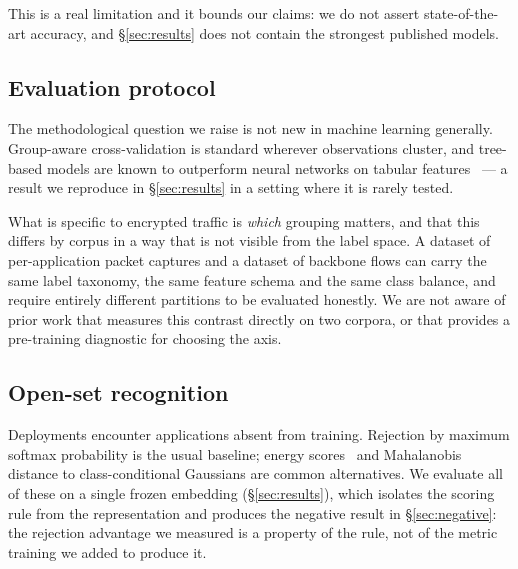 This is a real limitation and it bounds our claims: we do not assert
state-of-the-art accuracy, and \S\ref{sec:results} does not contain the
strongest published models.

\subsection{Evaluation protocol}

The methodological question we raise is not new in machine learning generally.
Group-aware cross-validation is standard wherever observations cluster, and
tree-based models are known to outperform neural networks on tabular
features~\cite{grinsztajn2022trees} --- a result we reproduce in
\S\ref{sec:results} in a setting where it is rarely tested.

What is specific to encrypted traffic is \emph{which} grouping matters, and
that this differs by corpus in a way that is not visible from the label space.
A dataset of per-application packet captures and a dataset of backbone flows
can carry the same label taxonomy, the same feature schema and the same class
balance, and require entirely different partitions to be evaluated honestly.
We are not aware of prior work that measures this contrast directly on two
corpora, or that provides a pre-training diagnostic for choosing the axis.

\subsection{Open-set recognition}

Deployments encounter applications absent from training. Rejection by maximum
softmax probability is the usual baseline; energy scores~\cite{liu2020energy}
and Mahalanobis distance to class-conditional Gaussians are common
alternatives. We evaluate all of these on a single frozen embedding
(\S\ref{sec:results}), which isolates the scoring rule from the representation
and produces the negative result in \S\ref{sec:negative}: the rejection
advantage we measured is a property of the rule, not of the metric training we
added to produce it.
